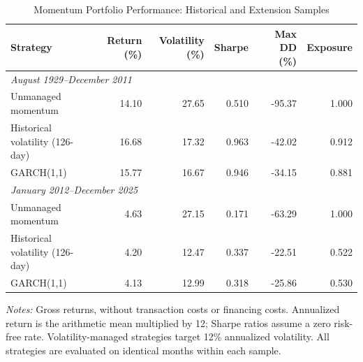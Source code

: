 \begin{table}[htbp]
\centering
\caption{Momentum Portfolio Performance: Historical and Extension Samples}
\label{tab:garch_portfolio_performance}
\small
\begin{tabular}{lrrrrr}
\toprule
Strategy & Return (\%) & Volatility (\%) & Sharpe & Max DD (\%) & Exposure \\
\midrule
\multicolumn{6}{l}{\textit{August 1929--December 2011}} \\
Unmanaged momentum & 14.10 & 27.65 & 0.510 & -95.37 & 1.000 \\
Historical volatility (126-day) & 16.68 & 17.32 & 0.963 & -42.02 & 0.912 \\
GARCH(1,1) & 15.77 & 16.67 & 0.946 & -34.15 & 0.881 \\
\midrule
\multicolumn{6}{l}{\textit{January 2012--December 2025}} \\
Unmanaged momentum & 4.63 & 27.15 & 0.171 & -63.29 & 1.000 \\
Historical volatility (126-day) & 4.20 & 12.47 & 0.337 & -22.51 & 0.522 \\
GARCH(1,1) & 4.13 & 12.99 & 0.318 & -25.86 & 0.530 \\
\bottomrule
\end{tabular}
\par\vspace{0.3em}
\begin{minipage}{0.95\linewidth}
\footnotesize\textit{Notes:} Gross returns, without transaction costs or financing costs. Annualized return is the arithmetic mean multiplied by 12; Sharpe ratios assume a zero risk-free rate. Volatility-managed strategies target 12\% annualized volatility. All strategies are evaluated on identical months within each sample.
\end{minipage}
\end{table}
